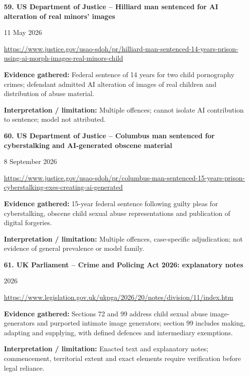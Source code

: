 \documentclass[11pt,a4paper]{article}
\begin{document}
\noindent\begin{minipage}{\linewidth}\textbf{59. US Department of Justice -- Hilliard man sentenced for AI alteration of real minors' images}\par{\small 11 May 2026\par\url{https://www.justice.gov/usao-sdoh/pr/hilliard-man-sentenced-14-years-prison-using-ai-morph-images-real-minors-child}}\par
\textbf{Evidence gathered:} Federal sentence of 14 years for two child pornography crimes; defendant admitted AI alteration of images of real children and distribution of abuse material.\par\textbf{Interpretation / limitation:} Multiple offences; cannot isolate AI contribution to sentence; model not attributed.\par
\end{minipage}\par\vspace{2mm}
\noindent\begin{minipage}{\linewidth}\textbf{60. US Department of Justice -- Columbus man sentenced for cyberstalking and AI-generated obscene material}\par{\small 8 September 2026\par\url{https://www.justice.gov/usao-sdoh/pr/columbus-man-sentenced-15-years-prison-cyberstalking-exes-creating-ai-generated}}\par
\textbf{Evidence gathered:} 15-year federal sentence following guilty pleas for cyberstalking, obscene child sexual abuse representations and publication of digital forgeries.\par\textbf{Interpretation / limitation:} Multiple offences, case-specific adjudication; not evidence of general prevalence or model family.\par
\end{minipage}\par\vspace{2mm}
\noindent\begin{minipage}{\linewidth}\textbf{61. UK Parliament -- Crime and Policing Act 2026: explanatory notes}\par{\small 2026\par\url{https://www.legislation.gov.uk/ukpga/2026/20/notes/division/11/index.htm}}\par
\textbf{Evidence gathered:} Sections 72 and 99 address child sexual abuse image-generators and purported intimate image generators; section 99 includes making, adapting and supplying, with defined defences and intermediary exemptions.\par\textbf{Interpretation / limitation:} Enacted text and explanatory notes; commencement, territorial extent and exact elements require verification before legal reliance.\par
\end{minipage}\par\vspace{2mm}
\end{document}
